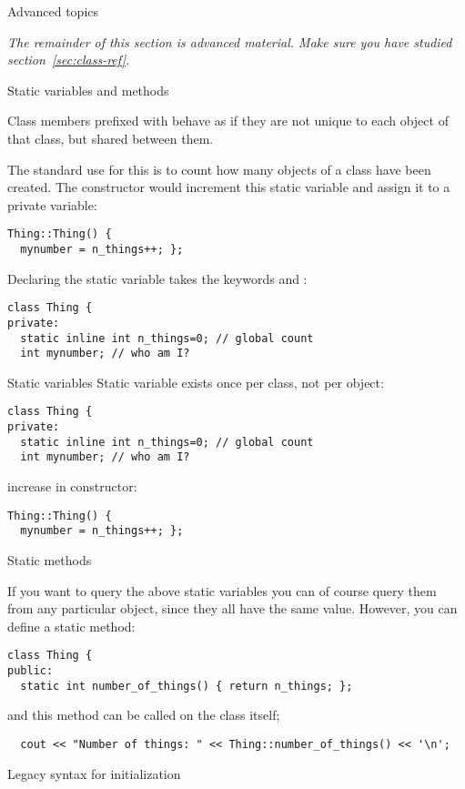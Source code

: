 {Advanced topics}

\emph{The remainder of this section is advanced material. Make sure
  you have studied section~\ref{sec:class-ref}.}

 {Static variables and methods}
\label{sec:class-static}

Class members prefixed with  behave as if
they are not unique to each object of that class,
but shared between them.

The standard use for this is to count how many objects
of a class have been created.
The constructor would increment this static variable
and assign it to a private variable:
\begin{lstlisting}
Thing::Thing() {
  mynumber = n_things++; };
\end{lstlisting}

Declaring the static variable takes the keywords
 and :
\begin{lstlisting}
class Thing {
private:
  static inline int n_things=0; // global count
  int mynumber; // who am I?
\end{lstlisting}

\begin{slide}{Static variables}
  \label{sl:static-var}
Static variable exists once per class, not per object:
\begin{lstlisting}
class Thing {
private:
  static inline int n_things=0; // global count
  int mynumber; // who am I?
\end{lstlisting}
increase in constructor:
\begin{lstlisting}
Thing::Thing() {
  mynumber = n_things++; };
\end{lstlisting}
\end{slide}

 {Static methods}

If you want to query the above static variables
you can of course query them from any particular object,
since they all have the same value.
However, you can define a static method:
\begin{lstlisting}
class Thing {
public:
  static int number_of_things() { return n_things; };
\end{lstlisting}
and this method can be called on the class itself;
\begin{lstlisting}
  cout << "Number of things: " << Thing::number_of_things() << '\n';
\end{lstlisting}

 {Legacy syntax for initialization}

